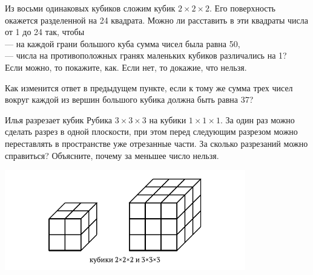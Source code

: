 ﻿
\begin{itemize}

\itA Из восьми одинаковых кубиков сложим кубик $2 \times 2 \times 2$. Его поверхность окажется разделенной на 24 квадрата. Можно ли расставить в эти квадраты числа от 1 до 24 так, чтобы \\
— на каждой грани большого куба сумма чисел была равна 50, \\
— числа на противоположных гранях маленьких кубиков различались на 1?\\
Если можно, то покажите, как. Если нет, то докажие, что нельзя.

\itB Как изменится ответ в предыдущем пункте, если к тому же сумма трех чисел вокруг каждой из вершин большого кубика должна быть равна 37?

\itC Илья разрезает кубик Рубика $3\times 3\times 3$ на кубики $1\times 1\times 1$. За один раз можно сделать разрез в одной плоскости, при этом перед следующим разрезом можно переставлять в пространстве уже отрезанные части. За сколько разрезаний можно справиться? Объясните, почему за меньшее число нельзя.
\end{itemize}

\vspace{-0.3cm}
\begin{center}
\includegraphics[width=10.5cm]{stats/2017/images/cubes.pdf}
\end{center} \vspace{-0.7cm}